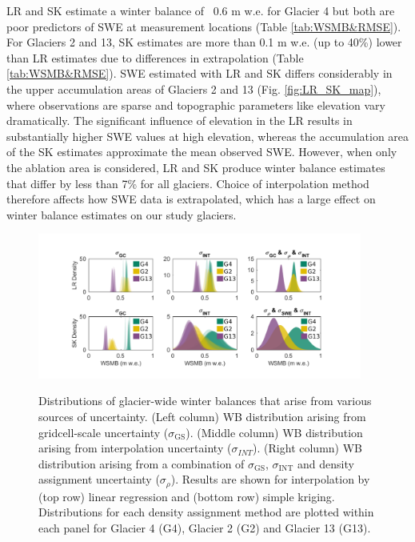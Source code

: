 \documentclass[twocolumn, letterpaper]{igs}
\begin{document}
LR and SK estimate a winter balance of ~0.6 m w.e. for Glacier 4 but both are poor predictors of SWE at measurement locations (Table \ref{tab:WSMB&RMSE}). For Glaciers 2 and 13, SK estimates are more than 0.1 m w.e. (up to 40\%) lower than LR estimates due to differences in extrapolation (Table \ref{tab:WSMB&RMSE}). SWE estimated with LR and SK differs considerably in the upper accumulation areas of Glaciers 2 and 13 (Fig. \ref{fig:LR_SK_map}), where observations are sparse and topographic parameters like elevation vary dramatically.  The significant influence of elevation in the LR results in substantially higher SWE values at high elevation, whereas the accumulation area of the SK estimates approximate the mean observed SWE. However, when only the ablation area is considered, LR and SK produce winter balance estimates that differ by less than 7\% for all glaciers. Choice of interpolation method therefore affects how SWE data is extrapolated, which has a large effect on winter balance estimates on our study glaciers. 


\begin{figure}
	\centering
	\includegraphics[width =0.95\textwidth]{WSMBDist.pdf}\\
	\caption{Distributions of glacier-wide winter balances that arise from various sources of uncertainty. (Left column) WB distribution arising from gridcell-scale uncertainty ($\sigma_{\mathrm{GS}}$). (Middle column) WB distribution arising from interpolation uncertainty ($\sigma_{INT}$). (Right column) WB distribution arising from a combination of $\sigma_{\mathrm{GS}}$, $\sigma_{\mathrm{INT}}$ and density assignment uncertainty ($\sigma_{\rho}$). Results are shown for interpolation by (top row) linear regression and (bottom row) simple kriging. Distributions for each density assignment method are plotted within each panel for Glacier 4 (G4), Glacier 2 (G2) and Glacier 13 (G13).}
	\label{fig:WSMBDist_LR}
\end{figure}
\end{document}
